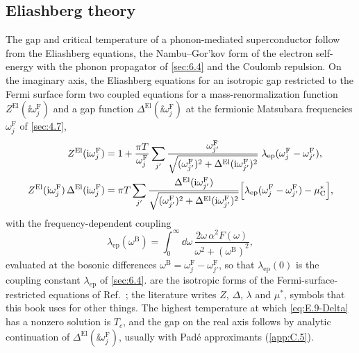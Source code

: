 \subsection{Eliashberg theory}

The gap and critical temperature of a phonon-mediated superconductor follow from the Eliashberg equations, the Nambu--Gor'kov form of the electron self-energy with the phonon propagator of \cref{sec:6.4} and the Coulomb repulsion. On the imaginary axis, the Eliashberg equations for an isotropic gap restricted to the Fermi surface form two coupled equations for a mass-renormalization function $Z^{\mathrm{El}}(\ii\omega^{\mathrm{F}}_j)$ and a gap function $\Delta^{\mathrm{El}}(\ii\omega^{\mathrm{F}}_j)$ at the fermionic Matsubara frequencies $\omega^{\mathrm{F}}_j$ of \cref{sec:4.7},
\begin{align}
  Z^{\mathrm{El}}(\mathrm{i}\omega^{\mathrm{F}}_j) &= 1 + \frac{\pi T}{\omega^{\mathrm{F}}_j}\sum_{j'}\frac{\omega^{\mathrm{F}}_{j'}}{\sqrt{(\omega^{\mathrm{F}}_{j'})^2 + \Delta^{\mathrm{El}}(\mathrm{i}\omega^{\mathrm{F}}_{j'})^2}}\;\lambda_{\mathrm{ep}}(\omega^{\mathrm{F}}_j - \omega^{\mathrm{F}}_{j'}) , \label{eq:E.9-Z}\\
  Z^{\mathrm{El}}(\mathrm{i}\omega^{\mathrm{F}}_j)\,\Delta^{\mathrm{El}}(\mathrm{i}\omega^{\mathrm{F}}_j) &= \pi T\sum_{j'}\frac{\Delta^{\mathrm{El}}(\mathrm{i}\omega^{\mathrm{F}}_{j'})}{\sqrt{(\omega^{\mathrm{F}}_{j'})^2 + \Delta^{\mathrm{El}}(\mathrm{i}\omega^{\mathrm{F}}_{j'})^2}}\Bigl[\lambda_{\mathrm{ep}}(\omega^{\mathrm{F}}_j - \omega^{\mathrm{F}}_{j'}) - \mu^*_{\mathrm{C}}\Bigr] , \label{eq:E.9-Delta}
\end{align}
with the frequency-dependent coupling
\begin{equation}
  \lambda_{\mathrm{ep}}(\omega^{\mathrm{B}}) = \int_0^\infty\dd\omega\,\frac{2\omega\,\alpha^2F(\omega)}{\omega^2 + (\omega^{\mathrm{B}})^2} ,
  \label{eq:E.9-lambda}
\end{equation}
evaluated at the bosonic differences $\omega^{\mathrm{B}} = \omega^{\mathrm{F}}_j - \omega^{\mathrm{F}}_{j'}$, so that $\lambda_{\mathrm{ep}}(0)$ is the coupling constant $\lambda_{\mathrm{ep}}$ of \cref{sec:6.4}.  are the isotropic forms of the Fermi-surface-restricted equations of Ref.~\cite[Eqs.~(41), (42) and~(48)]{lee2023electron}; the literature writes $Z$, $\Delta$, $\lambda$ and $\mu^*$, symbols that this book uses for other things. The highest temperature at which \cref{eq:E.9-Delta} has a nonzero solution is $T_c$, and the gap on the real axis follows by analytic continuation of $\Delta^{\mathrm{El}}(\ii\omega^{\mathrm{F}}_j)$, usually with Padé approximants (\cref{app:C.5}).

